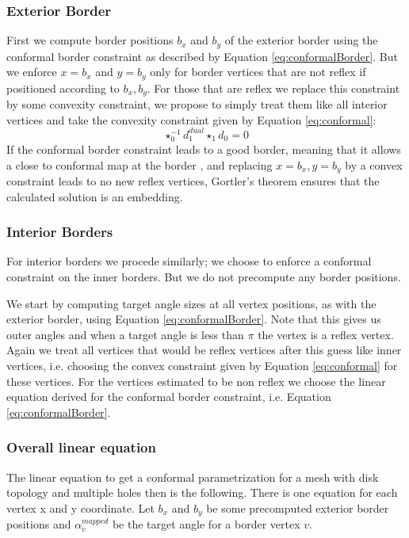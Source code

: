 \subsubsection{Exterior Border}
First we compute border positions $b_x$ and $b_y$ of the exterior border using the conformal border constraint as described by Equation \ref{eq:conformalBorder}. But we enforce $x = b_x$ and $y= b_y$ only for border vertices that are not reflex if positioned according to $b_x, b_y$. For those that are reflex we replace this constraint by some convexity constraint, we propose to simply treat them like all interior vertices and take the convexity constraint given by Equation \ref{eq:conformal}:
\[\star_0^{-1} d_1^{dual} \star_1 d_0=0\]
If the conformal border constraint leads to a good border, meaning that it allows a close to conformal map at the border , and replacing $x=b_x, y=b_y$ by a convex constraint leads to no new reflex vertices, Gortler's theorem ensures that the calculated solution is an embedding.

\subsubsection{Interior Borders}
For interior borders we procede similarly; we choose to enforce a conformal constraint on the inner borders. But we do not precompute any border positions.

We start by computing target angle sizes at all vertex positions, as with the exterior border, using Equation \ref{eq:conformalBorder}. Note that this gives us outer angles  and when a target angle is less than $\pi$ the vertex is a reflex vertex. Again we treat all vertices that would be reflex vertices after this guess like inner vertices, i.e. choosing the convex constraint given by Equation \ref{eq:conformal} for these vertices. For the vertices estimated to be non reflex we choose the linear equation derived for the conformal border constraint, i.e. Equation \ref{eq:conformalBorder}.

\subsubsection{Overall linear equation}
The linear equation to get a conformal parametrization for a mesh with disk topology and multiple holes then is the following.
There is one equation for each vertex x and y coordinate. Let $b_x$ and $b_y$ be some precomputed exterior border positions and $\alpha_v^{mapped}$ be the target angle for a border vertex $v$.

